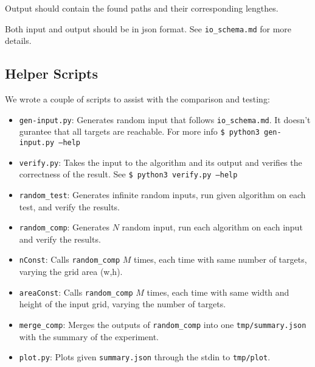 Output should contain the found paths and their corresponding lengthes.

Both input and output should be in json format. See \texttt{io\_schema.md} for more details.

\subsection{Helper Scripts}
We wrote a couple of scripts to assist with the comparison and testing:
\begin{itemize}
    \item \texttt{gen-input.py}: Generates random input that follows \texttt{io\_schema.md}. It doesn't gurantee that all targets are reachable. For more info \texttt{\$ python3 gen-input.py --help}
    \item \texttt{verify.py}: Takes the input to the algorithm and its output and verifies the correctness of the result. See \texttt{\$ python3 verify.py --help}
    \item \texttt{random\_test}: Generates infinite random inputs, run given algorithm on each test, and verify the results.
    \item \texttt{random\_comp}: Generates $N$ random input, run each algorithm on each input and verify the results.
    \item \texttt{nConst}: Calls \texttt{random\_comp} $M$ times, each time with same number of targets, varying the grid area (w,h).
    \item \texttt{areaConst}: Calls \texttt{random\_comp} $M$ times, each time with same width and height of the input grid, varying the number of targets.
    \item \texttt{merge\_comp}: Merges the outputs of \texttt{random\_comp} into one \texttt{tmp/summary.json} with the summary of the experiment.
    \item \texttt{plot.py}: Plots given \texttt{summary.json} through the stdin to \texttt{tmp/plot}.
\end{itemize}